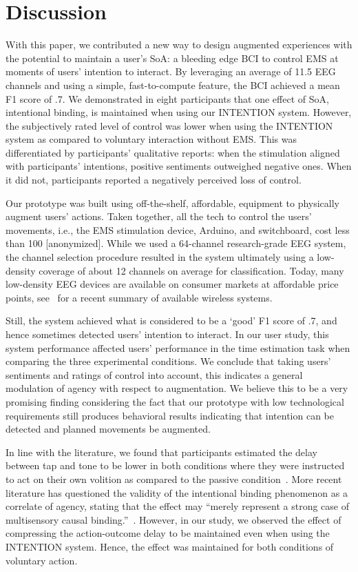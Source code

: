 \section{Discussion}
With this paper, we contributed a new way to design augmented experiences with the potential to maintain a user's SoA: a bleeding edge BCI to control EMS at moments of users' intention to interact. By leveraging an average of 11.5 EEG channels and using a simple, fast-to-compute feature, the BCI achieved a mean F1 score of .7. We demonstrated in eight participants that one effect of SoA, intentional binding, is maintained when using our INTENTION system. However, the subjectively rated level of control was lower when using the INTENTION system as compared to voluntary interaction without EMS. This was differentiated by participants' qualitative reports: when the stimulation aligned with participants' intentions, positive sentiments outweighed negative ones. When it did not, participants reported a negatively perceived loss of control.

Our prototype was built using off-the-shelf, affordable, equipment to physically augment users' actions. Taken together, all the tech to control the users' movements, i.e., the EMS stimulation device, Arduino, and switchboard, cost less than 100 [anonymized]. While we used a 64-channel research-grade EEG system, the channel selection procedure resulted in the system ultimately using a low-density coverage of about 12 channels on average for classification. Today, many low-density EEG devices are available on consumer markets at affordable price points, see~\citet{Niso2023-ce} for a recent summary of available wireless systems. 

Still, the system achieved what is considered to be a `good' F1 score of .7, and hence sometimes detected users' intention to interact. In our user study, this system performance affected users' performance in the time estimation task when comparing the three experimental conditions. We conclude that taking users' sentiments and ratings of control into account, this indicates a general modulation of agency with respect to augmentation. We believe this to be a very promising finding considering the fact that our prototype with low technological requirements still produces behavioral results indicating that intention can be detected and planned movements be augmented.

In line with the literature, we found that participants estimated the delay between tap and tone to be lower in both conditions where they were instructed to act on their own volition as compared to the passive condition~\cite{Moore2012-dk}. More recent literature has questioned the validity of the intentional binding phenomenon as a correlate of agency, stating that the effect may ``merely represent a strong case of multisensory causal binding.''~\cite{Suzuki2019-pi, Gutzeit2023-ei, Hoerl2020-my}. However, in our study, we observed the effect of compressing the action-outcome delay to be maintained even when using the INTENTION system. Hence, the effect was maintained for both conditions of voluntary action.

